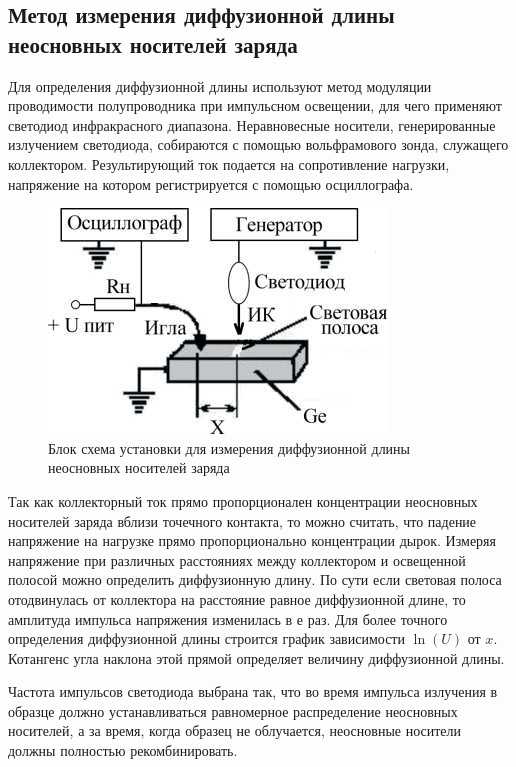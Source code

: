 \subsection{Метод измерения диффузионной длины неосновных носителей заряда}

Для определения диффузионной длины используют метод модуляции проводимости полупроводника при импульсном освещении, для
чего применяют светодиод инфракрасного диапазона. Неравновесные носители, генерированные излучением светодиода,
собираются с помощью вольфрамового зонда, служащего коллектором. Результирующий ток подается на сопротивление нагрузки,
напряжение на котором регистрируется с помощью осциллографа.

\begin{figure}[H]
	\centering
	\includegraphics[]{img/13}
	\caption{Блок схема установки для измерения диффузионной длины неосновных носителей заряда}
	\label{fig:figure12}
\end{figure}


Так как коллекторный ток прямо пропорционален концентрации неосновных носителей заряда вблизи точечного контакта, то
можно считать, что падение напряжение на нагрузке прямо пропорционально концентрации дырок. Измеряя напряжение при
различных расстояниях между коллектором и освещенной полосой можно определить диффузионную длину. По сути если световая
полоса отодвинулась от коллектора на расстояние равное диффузионной длине, то амплитуда импульса напряжения изменилась в
$е$ раз. Для более точного определения диффузионной длины строится график зависимости $\ln(U)$ от $x$. Котангенс угла
наклона этой прямой определяет величину диффузионной длины.

Частота импульсов светодиода выбрана так, что во время импульса излучения в образце должно устанавливаться равномерное
распределение неосновных носителей, а за время, когда образец не облучается, неосновные носители должны полностью
рекомбинировать.

